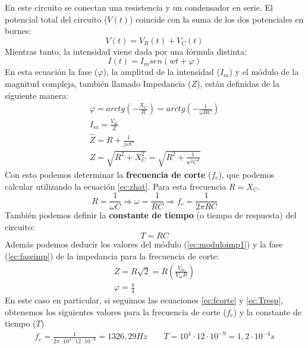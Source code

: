 \documentclass[12pt, a4paper, titlepage]{article}
\begin{document}
  En este circuito se conectan una resistencia y un condensador en serie. El potencial total del circuito ($V(t)$) coincide con la suma de los dos potenciales en bornes:
  \begin{equation}
    V(t) = V_R(t) + V_C(t)
  \end{equation}
  Mientras tanto, la intensidad viene dada por una fórmula distinta:
  \begin{equation}
    I(t) = I_m sen(wt + \varphi) \label{ec:faseimp}
  \end{equation}
  En esta ecuación la fase ($\varphi$), la amplitud de la intensidad ($I_m$) y el módulo de la magnitud compleja, también llamado Impedancia ($Z$), están definidas de la siguiente manera:
  \begin{gather}
    \varphi = arctg\left(-\frac{X_C}{R}\right) = arctg\left(-\frac{1}{\omega RC}\right) \\
    I_m = \frac{V_m}{Z} \\
    \hat{Z} = R + \frac{1}{j\omega C} \label{ec:zhat} \\
    Z = \sqrt{R^2+X_C^2} = \sqrt{R^2+\frac{1}{w^2C^2}} \label{ec:moduloimp1}
  \end{gather}
  Con esto podemos determinar la \textbf{frecuencia de corte} ($f_c$), que podemos calcular utilizando la ecuación \ref{ec:zhat}. Para esta frecuencia $R = X_C$.
  \begin{equation}
    R = \frac{1}{\omega C} \Rightarrow \omega = \frac{1}{RC} \Rightarrow f_c = \frac{1}{2\pi RC} \label{ec:fcorte}
  \end{equation}
  También podemos definir la \textbf{constante de tiempo} (o tiempo de respuesta) del circuito:
  \begin{equation}
    T = RC \label{ec:Tresp}
  \end{equation}
  Además podemos deducir los valores del módulo (\ref{ec:moduloimp1}) y la fase (\ref{ec:faseimp}) de la impedancia para la frecuencia de corte:
  \begin{gather}
    Z = R\sqrt{2} = R\left(\frac{V_m}{V_mR}\right) \label{ec:moduloimp2} \\ \varphi = \frac{\pi}{4} \nonumber
  \end{gather}
  En este caso en particular, si seguimos las ecuaciones \ref{ec:fcorte} y \ref{ec:Tresp}, obtenemos los siguientes valores para la frecuencia de corte ($f_c$) y la constante de tiempo ($T$)
  \begin{gather}
    f_c = \frac{1}{2\pi \cdot 10^4 \cdot 12 \cdot 10^{-9}} = 1326,29 Hz \qquad T = 10^4 \cdot 12 \cdot 10^{-9} = 1,2 \cdot 10^{-4} s \nonumber
  \end{gather}
\end{document}
